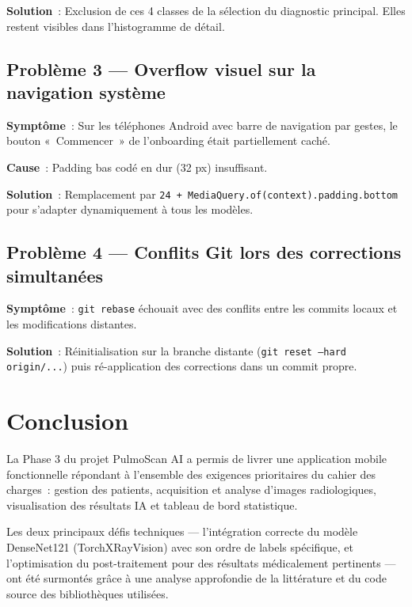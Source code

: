 \documentclass[12pt, a4paper]{report}
\begin{document}
\textbf{Solution}~: Exclusion de ces 4 classes de la sélection du diagnostic
principal. Elles restent visibles dans l'histogramme de détail.

\section{Problème 3 — Overflow visuel sur la navigation système}

\textbf{Symptôme}~: Sur les téléphones Android avec barre de navigation par
gestes, le bouton «~Commencer~» de l'onboarding était partiellement caché.

\textbf{Cause}~: Padding bas codé en dur (32 px) insuffisant.

\textbf{Solution}~: Remplacement par
\texttt{24 + MediaQuery.of(context).padding.bottom} pour s'adapter
dynamiquement à tous les modèles.

\section{Problème 4 — Conflits Git lors des corrections simultanées}

\textbf{Symptôme}~: \texttt{git rebase} échouait avec des conflits entre les
commits locaux et les modifications distantes.

\textbf{Solution}~: Réinitialisation sur la branche distante (\texttt{git reset
--hard origin/...}) puis ré-application des corrections dans un commit propre.

\chapter*{Conclusion}

La Phase 3 du projet PulmoScan AI a permis de livrer une application mobile
fonctionnelle répondant à l'ensemble des exigences prioritaires du cahier des
charges~: gestion des patients, acquisition et analyse d'images radiologiques,
visualisation des résultats IA et tableau de bord statistique.

Les deux principaux défis techniques — l'intégration correcte du modèle
DenseNet121 (TorchXRayVision) avec son ordre de labels spécifique, et
l'optimisation du post-traitement pour des résultats médicalement pertinents —
ont été surmontés grâce à une analyse approfondie de la littérature et du code
source des bibliothèques utilisées.
\end{document}
